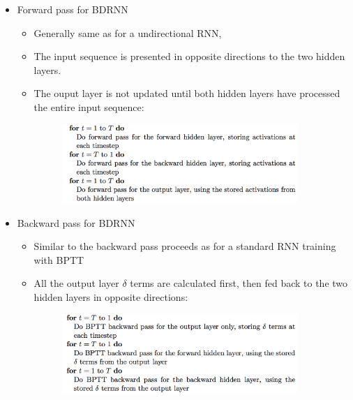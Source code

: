 \documentclass{beamer}
\begin{document}
{
    \begin{itemize}
        \item Forward pass for BDRNN 
            \begin{itemize} 
                \item Generally same as for a undirectional RNN, 
                \item The input sequence is presented in opposite directions to the two hidden layers. 
                \item The ouput layer is not updated until both hidden layers have processed the entire input sequence:
	            \begin{figure}[ht]  
	            	\begin{center}
	            		\includegraphics[width=3.5in]{Images/BDRNN_forward_pass.png}   
	            	\end{center}   
	            \end{figure}
            \end{itemize}
    \end{itemize}
}
\frame
{
    \begin{itemize}
        \item Backward pass for BDRNN 
            \begin{itemize} 
                \item Similar to the backward pass proceeds as for a standard RNN training with BPTT  
                \item All the output layer $ \delta $ terms are calculated first, 
                    then fed back to the two hidden layers in opposite directions:
	            \begin{figure}[ht]  
	            	\begin{center}
	            		\includegraphics[width=3.5in]{Images/BDRNN_backward_pass.png}   
	            	\end{center}   
	            \end{figure}
            \end{itemize}
    \end{itemize}
}
\end{document}
